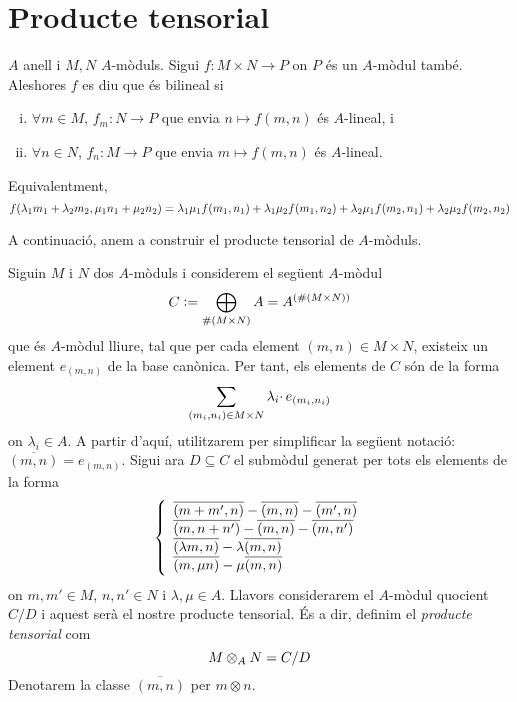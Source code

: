 \documentclass[../../../main.tex]{subfiles}
\begin{document}
\section{Producte tensorial}


\begin{defi}[Bilineal]
$A$ anell i $M,N$ $A$-mòduls. Sigui $f:M\times N\to P$ on $P$ és un $A$-mòdul també. Aleshores $f$ es diu que és bilineal si
\begin{enumerate}[(i)]
    \item $\forall m\in M$, $f_m:N\to P$ que envia $n\mapsto f(m,n)$ és $A$-lineal, i
    \item $\forall n\in N$, $f_n:M\to P$ que envia $m\mapsto f(m,n)$ és $A$-lineal.
\end{enumerate}
Equivalentment, 
\begin{equation}
    \notag
    f(\lambda_1m_1+\lambda_2m_2,\mu_1n_1+\mu_2n_2) = \lambda_1\mu_1f(m_1,n_1)+\lambda_1\mu_2f(m_1,n_2)+\lambda_2\mu_1f(m_2,n_1)+\lambda_2\mu_2f(m_2,n_2)
\end{equation}
\end{defi}

A continuació, anem a construir el producte tensorial de $A$-mòduls.

\begin{defi}
\label{def:construccioProducteTensorial} Siguin $M$ i $N$ dos $A$-mòduls i considerem el següent $A$-mòdul
\begin{equation}
    \notag
    C:=\bigoplus_{\#(M\times N)}A = A^{(\#(M\times N))}
\end{equation}
que és $A$-mòdul lliure, tal que per cada element $(m,n)\in M\times N$, existeix un element $e_{(m,n)}$ de la base canònica. Per tant, els elements de $C$ són de la forma
\begin{equation}
    \notag
    \sum_{(m_i,n_i)\in M\times N}\lambda_i\cdotp e_{(m_i,n_i)}
\end{equation}
on $\lambda_i\in A$. A partir d'aquí, utilitzarem per simplificar la següent notació: $\overline{(m,n)} = e_{(m,n)}$. Sigui ara $D\subseteq C$ el submòdul generat per tots els elements de la forma
\begin{equation}
    \notag
    \left\{
    \begin{array}{ll}
        \overline{(m+m',n)}-\overline{(m,n)}-\overline{(m',n)}\\
        \overline{(m,n+n')}-\overline{(m,n)}-\overline{(m,n')}\\
        \overline{(\lambda m,n)}-\lambda\overline{(m,n)}\\
        \overline{(m,\mu n)}-\mu\overline{(m,n)}
    \end{array}
    \right.
\end{equation}
on $m,m'\in M$, $n,n'\in N$ i $\lambda,\mu\in A$. Llavors considerarem el $A$-mòdul quocient $C/D$ i aquest serà el nostre producte tensorial. És a dir, definim el \textit{producte tensorial} com
\begin{equation}
    \notag
    M\otimes_AN = C/D
\end{equation}
Denotarem la classe $\overline{(m,n)}$ per $m\otimes n$.
\end{defi}
\end{document}
